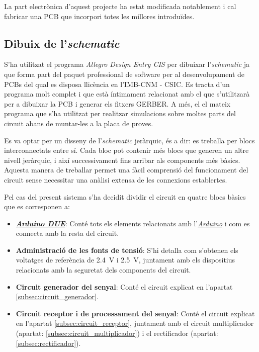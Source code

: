 La part electrònica d'aquest projecte ha estat modificada notablement i cal fabricar una \ac{PCB} que incorpori totes les millores introduïdes.

\subsection{Dibuix de l'\textit{schematic}}\label{subsec:schematic}

S'ha utilitzat el programa \textit{Allegro Design Entry CIS} per dibuixar l'\textit{schematic} ja que forma part del paquet professional de software per al desenvolupament de \acp{PCB} del qual es disposa llicència en l'\ac{IMB}-\ac{CNM} - \ac{CSIC}. Es tracta d'un programa molt complet i que està íntimament relacionat amb el que s'utilitzarà per a dibuixar la \ac{PCB} i generar els fitxers GERBER. A més, el el mateix programa que s'ha utilitzat per realitzar simulacions sobre moltes parts del circuit abans de muntar-les a la placa de proves.

Es va optar per un disseny de l'\textit{schematic} jeràrquic, és a dir: es treballa per blocs interconnectats entre sí. Cada bloc pot contenir més blocs que generen un altre nivell jeràrquic, i així successivament fins arribar als components més bàsics. Aquesta manera de treballar permet una fàcil comprensió del funcionament del circuit sense necessitar una anàlisi extensa de les connexions establertes.

Pel cas del present sistema s'ha decidit dividir el circuit en quatre blocs bàsics que es corresponen a:

\begin{itemize}
	
	\item{\textbf{\hyperref[subsec:arduino]{\textit{Arduino DUE}}}: }Conté tots els elements relacionats amb l'\hyperref[subsec:arduino]{\textit{Arduino}} i com es connecta amb la resta del circuit.
	
	\item{\textbf{Administració de les fonts de tensió}: }S'hi detalla com s'obtenen els voltatges de referència de \SI{2.4}{\volt} i \SI{2.5}{\volt}, juntament amb els dispositius relacionats amb la seguretat dels components del circuit.
	
	\item{\textbf{Circuit generador del senyal}: }Conté el circuit explicat en l'apartat \ref{subsec:circuit_generador}.
	
	\item{\textbf{Circuit receptor i de processament del senyal}: }Conté el circuit explicat en l'apartat \ref{subsec:circuit_receptor}, juntament amb el circuit multiplicador (apartat: \ref{subsec:circuit_multiplicador}) i el rectificador (apartat: \ref{subsec:rectificador}).
	
\end{itemize}

